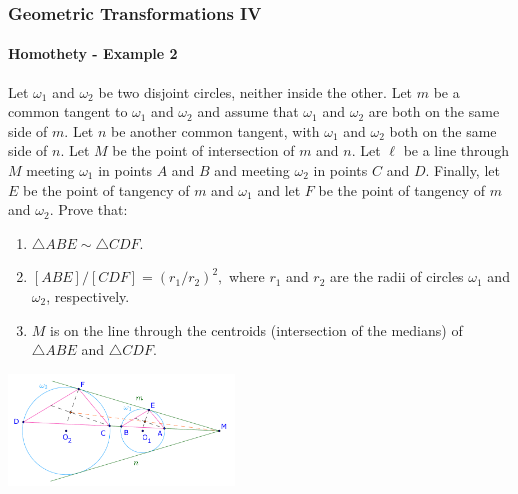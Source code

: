 \documentclass[8pt,xcolor=table,dvipsnames]{beamer}
\begin{document}
\begin{frame}[t]
    \frametitle{Geometric Transformations IV}
    \framesubtitle{Homothety - Example 2}
    \begin{example}
        Let $\omega_1$ and $\omega_2$ be two disjoint circles, neither inside the other.
        Let $m$ be a common tangent to $\omega_1$ and $\omega_2$ and assume that $\omega_1$ and $\omega_2$ are both on the same side of $m$.
        Let $n$ be another common tangent, with $\omega_1$ and $\omega_2$ both on the same side of $n$.
        Let $M$ be the point of intersection of $m$ and $n$. Let $\ell$ be a line through $M$ meeting $\omega_1$ in points $A$ and $B$ and meeting $\omega_2$ in points $C$ and $D$.
        Finally, let $E$ be the point of tangency of $m$ and $\omega_1$ and let $F$ be the point of tangency of $m$ and $\omega_2$.
        Prove that:
        \begin{enumerate}
            \item $\triangle ABE \sim \triangle CDF$.
            \item $[ABE]/[CDF] = (r_1/r_2)^2,$ where $r_1$ and $r_2$ are the radii of circles $\omega_1$ and $\omega_2$, respectively.
            \item $M$ is on the line through the centroids (intersection of the medians) of $\triangle ABE$ and $\triangle CDF$.
        \end{enumerate}
    \end{example}
    \begin{center}
        \includegraphics[width=6cm]{./svg/pdf/homothety-p2.pdf}
    \end{center}
\end{frame}
\end{document}
